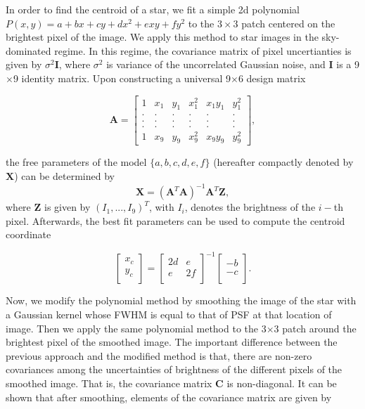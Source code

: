\documentclass[12pt, preprint]{aastex}
\newcommand{\beq}{\begin{equation}}
\newcommand{\eeq}{\end{equation}}
\begin{document}
In order to find the centroid of a star, we fit a simple 2d polynomial $P(x,y)=a+bx+cy+dx^2+exy+fy^2$ to the $3\times3$ patch centered on the brightest pixel of the
image. We apply this method to star images in the sky-dominated regime. In this regime, the covariance matrix of pixel uncertianties is given by $\sigma^{2}\mathbf{I}$, where $\sigma^{2}$ is variance of the uncorrelated Gaussian noise, and $\mathbf{I}$ is a 9$\times$9 identity matrix. Upon constructing a universal 9$\times$6 design matrix

\begin{equation}
    \mathbf{A} = 
    \begin{bmatrix}
        1 & x_{1} & y_{1} & x_{1}^{2} & x_{1}y_{1} & y_{1}^{2} \\
        . & . & . & . & . & .  \\
        . & . & . & . & . & .  \\
        . & . & . & . & . & .  \\
        1 & x_{9} & y_{9} & x_{9}^{2} & x_{9}y_{9} & y_{9}^{2}
    \end{bmatrix},
\end{equation}



the free parameters of the model $\{a,b,c,d,e,f\}$ (hereafter compactly denoted by $\mathbf{X}$) can be determined by 
\beq
\mathbf{X} = (\mathbf{A}^{T}\mathbf{A})^{-1}\mathbf{A}^{T}\mathbf{Z},
\label{linearfit}
\eeq
where $\mathbf{Z}$ is given by $(I_{1},...,I_{9})^{T}$, with $I_{i}$, denotes the brightness of the $i-$th pixel. Afterwards, the best fit parameters can be used to compute the centroid coordinate

\beq
  \begin{bmatrix}
      x_{c}\\
      y_{c}\\
  \end{bmatrix} = 
  \begin{bmatrix}
      2d & e\\
      e & 2f\\
  \end{bmatrix}^{-1}
  \begin{bmatrix}
      -b\\
      -c\\
  \end{bmatrix}.
\label{center}
\eeq

Now, we modify the polynomial method by smoothing the image of the star with a Gaussian kernel whose FWHM is equal to that of PSF at that location of image. Then we apply the same polynomial method to the 3$\times$3 patch around the brightest pixel of the smoothed image. The important difference between the previous approach and the modified method is that, there are non-zero covariances among the uncertainties of brightness of the different pixels of the smoothed image. That is, the covariance matrix $\mathbf{C}$ is non-diagonal. It can be shown that after smoothing, elements of the covariance matrix are given by
\end{document}
